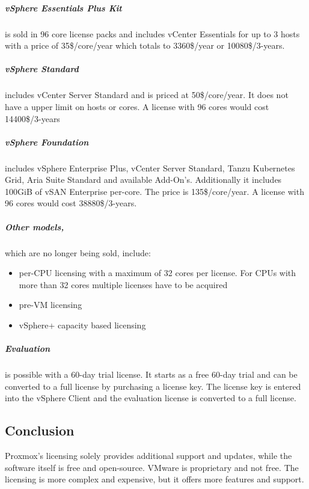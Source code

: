 \subparagraph{vSphere Essentials Plus Kit}
is sold in 96 core license packs and includes vCenter Essentials for up to 3 hosts with a price of \num{35}\$/core/year which totals to \num{3360}\$/year or \num{10080}\$/3-years.

\subparagraph{vSphere Standard} includes vCenter Server Standard and is priced at \num{50}\$/core/year. It does not have a upper limit on hosts or cores. A license with 96 cores would cost \num{14400}\$/3-years 

\subparagraph{vSphere Foundation} includes vSphere Enterprise Plus, vCenter Server Standard, Tanzu Kubernetes Grid, Aria Suite Standard and available Add-On's. Additionally it includes 100GiB of vSAN Enterprise per-core. The price is \num{135}\$/core/year. 
A license with 96 cores would cost \num{38880}\$/3-years.


\subparagraph{Other models,} which are no longer being sold, include: 
\begin{itemize}
	\item per-CPU licensing with a maximum of 32 cores per license. For CPUs with more than 32 cores multiple licenses have to be acquired
	\item pre-VM licensing
	\item vSphere+ capacity based licensing
\end{itemize}

\subparagraph{Evaluation} is possible with a 60-day trial license.
It starts as a free 60-day trial and can be converted to a full license by purchasing a license key. The license key is entered into the vSphere Client and the evaluation license is converted to a full license.

\subsection{Conclusion}

Proxmox's licensing solely provides additional support and updates, while the software itself is free and open-source. 
VMware is proprietary and not free. The licensing is more complex and expensive, but it offers more features and support. 
